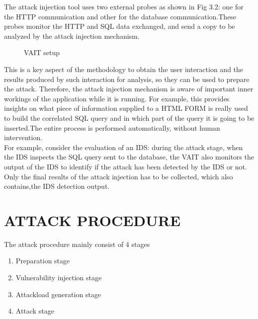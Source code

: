 The attack injection tool uses two external
probes as shown in Fig 3.2: one for the HTTP communication and other for the
database communication.These probes monitor the HTTP
and SQL data exchanged, and send a copy to be analyzed
by the attack injection mechanism.
\begin{figure}[H]
\centering
{}
\caption{VAIT setup}
\label{fig:Fig2}
\end{figure}

This is a key aspect of
the methodology to obtain the user interaction and the
results produced by such interaction for analysis, so they
can be used to prepare the attack. Therefore, the attack injection mechanism is aware of important inner workings of the
application while it is running. For example, this provides
insights on what piece of information supplied to a HTML
FORM is really used to build the correlated SQL query and
in which part of the query it is going to be inserted.The entire process is performed automatically, without human intervention.\\
\newline
For example,  consider the evaluation of an IDS: during the attack stage, when the IDS
inspects the SQL query sent to the database, the VAIT also
monitors the output of the IDS to identify if the attack has
been detected by the IDS or not. Only the
final results of the attack injection has to be collected, which also contains,the IDS detection output.\\
\section{ATTACK PROCEDURE}
The attack procedure mainly consist of 4 stages
\begin{enumerate}
	\item Preparation stage
	\item Vulnerability injection stage
	\item Attackload generation stage
	\item Attack stage
\end{enumerate}

